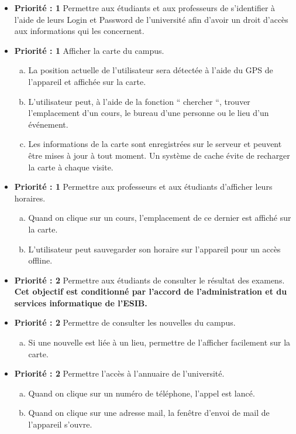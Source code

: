 \begin{itemize}
	\item \textbf{Priorité : 1}  Permettre aux étudiants et aux professeurs de s'identifier à l'aide de leurs Login et Password de l'université afin d'avoir un droit d'accès aux informations qui les concernent.
	\item \textbf{Priorité : 1} Afficher la carte du campus.
	\begin{enumerate}[a)]
		\item La position actuelle de l'utilisateur sera détectée à l'aide du \gls{GPS} de l'appareil et affichée sur la carte.
		\item L'utilisateur peut, à l'aide de la fonction `` chercher ``, trouver l'emplacement d'un cours, le bureau d'une personne ou le lieu d'un événement.
		\item Les informations de la carte sont enregistrées sur le serveur et peuvent être mises à jour à tout moment. Un système de cache évite de recharger la carte à chaque visite.
	\end{enumerate}
	\item \textbf{Priorité : 1} Permettre aux professeurs et aux étudiants d'afficher leurs horaires.
	\begin{enumerate}[a)]
		\item Quand on clique sur un cours, l'emplacement de ce dernier est affiché sur la carte.
		\item L'utilisateur peut sauvegarder son horaire sur l'appareil pour un accès offline.
	\end{enumerate}
	\item \textbf{Priorité : 2} Permettre aux étudiants de consulter le résultat des examens. \textbf{Cet objectif est conditionné par l'accord de l'administration et du services informatique de l'\gls{ESIB}.}
	\item \textbf{Priorité : 2} Permettre de consulter les nouvelles du campus.
		\begin{enumerate}[a)]
			\item Si une nouvelle est liée à un lieu, permettre de l'afficher facilement sur la carte.
		\end{enumerate}
	\item \textbf{Priorité : 2} Permettre l'accès à l'annuaire de l'université. 
		\begin{enumerate}[a)]
			\item Quand on clique sur un numéro de téléphone, l'appel est lancé.
			\item Quand on clique sur une adresse mail, la fenêtre d'envoi de mail de l'appareil s'ouvre.
		\end{enumerate}
\end{itemize}

